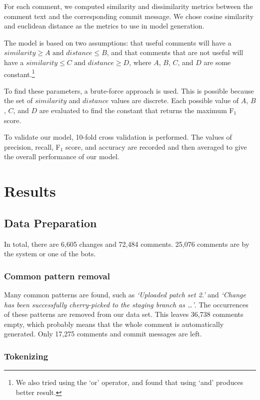 \documentclass[conference]{IEEEtran}
\begin{document}
For each comment, we computed similarity and dissimilarity metrics
between the comment text and the corresponding commit message.
We chose cosine similarity and euclidean distance as the metrics to use in model generation.

The model is based on two assumptions: that useful comments will have a $similarity \geq A \text{ and } distance \leq B$,
and that comments that are not useful will have a $ similarity \leq C \text{ and } distance \geq D$,
where $A$, $B$, $C$, and $D$ are some constant.\footnote{We also tried using the `or' operator, and found that using `and' produces better result.}

To find these parameters, a brute-force approach is used.
This is possible because the set of $similarity$ and $distance$ values are discrete.
Each possible value of $A$, $B$, $C$, and $D$ are evaluated to find the constant that returns the maximum F$_1$ score.

To validate our model, 10-fold cross validation is performed.
The values of precision, recall, F$_1$ score, and accuracy are recorded and then averaged
to give the overall performance of our model.


\section{Results}

\subsection{Data Preparation}

In total, there are 6,605 changes and 72,484 comments. 25,076 comments are by the system or one of the bots.

\subsubsection{Common pattern removal}

Many common patterns are found, such as \emph{`Uploaded patch set 2.'} and \emph{`Change has been successfully cherry-picked to the staging branch as \dots'}.
The occurrences of these patterns are removed from our data set.
This leaves 36,738 comments empty, which probably means that the whole comment is automatically generated.
Only 17,275 comments and commit messages are left.

\subsubsection{Tokenizing}
\end{document}
